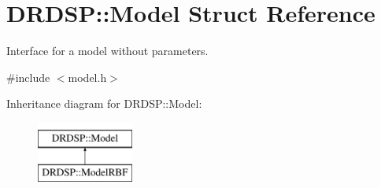 \hypertarget{struct_d_r_d_s_p_1_1_model}{\section{D\-R\-D\-S\-P\-:\-:Model Struct Reference}
\label{struct_d_r_d_s_p_1_1_model}
}


Interface for a model without parameters.  




{\ttfamily \#include $<$model.\-h$>$}

Inheritance diagram for D\-R\-D\-S\-P\-:\-:Model\-:\begin{figure}[H]
\begin{center}
\leavevmode
\includegraphics[height=2.000000cm]{struct_d_r_d_s_p_1_1_model}
\end{center}
\end{figure}
